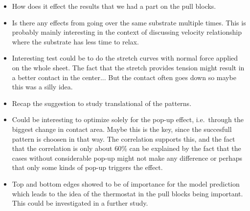 \begin{itemize}
  \item How does it effect the results that we had a part on the pull blocks. 
  \item Is there any effects from going over the same substrate multiple times. This is probably mainly interesting in the context of discussing velocity relationship where the substrate has less time to relax.
  \item Interesting test could be to do the stretch curves with normal force applied on the whole sheet. The fact that the stretch provides tension might result in a better contact in the center... But the contact often goes down so maybe this was a silly idea.
  \item Recap the suggestion to study translational of the patterns.
  \item Could be interesting to optimize solely for the pop-up effect, i.e.\ through the biggest change in contact area. Maybe this is the key, since the succesfull pattern is choosen in that way. The correlation supports this, and the fact that the correlation is only about 60\% can be explained by the fact that the cases without considerable pop-up might not make any difference or perhaps that only some kinds of pop-up triggers the effect. 
  \item Top and bottom edges showed to be of importance for the model prediction which leads to the idea of the thermostat in the pull blocks being important. This could be investigated in a further study. 
\end{itemize}



